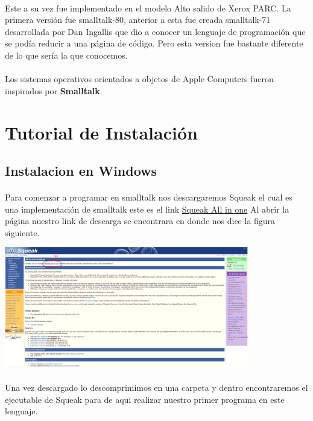 \documentclass[11pt]{article}
\begin{document}
\paragraph{} \noindent
Este a su vez fue implementado en el modelo Alto salido de Xerox PARC. La primera versión fue smalltalk-80, anterior a esta fue creada smalltalk-71 desarrollada por Dan Ingallis que dio a conocer un lenguaje de programación que se podía reducir a una página de código. Pero esta version fue bastante diferente de lo que sería la que conocemos.
\paragraph{} \noindent
Los sistemas operativos orientados a objetos de Apple Computers fueron inspirados por \textbf{Smalltalk}.
\section{\textbf{Tutorial de Instalación}}
\subsection{\textbf{Instalacion en Windows}}
\paragraph{} \noindent
Para comenzar a programar en smalltalk nos descargaremos Squeak el cual es una implementación de smalltalk este es el link \href{http://www.squeak.org/Download/}{Squeak All in one}
Al abrir la página nuestro link de descarga se encontrara en donde nos dice la figura siguiente.

				\begin{center}
				\includegraphics[width=0.8\textwidth]{images/tutorial}
				\end{center}
\paragraph{} \noindent
Una vez descargado lo descomprimimos en una carpeta y dentro encontraremos el ejecutable de Squeak para de aqui realizar nuestro primer programa en este lenguaje.
\end{document}

